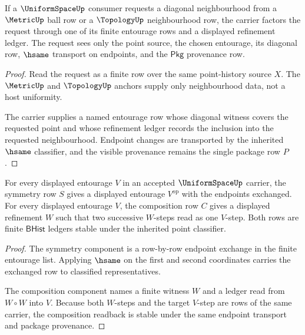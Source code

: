 \begin{theorem}
\label{thm:uniformspace-diagonal-refinement-obligation}
If a $\UniformSpaceUp$ consumer requests a diagonal neighbourhood from a
$\MetricUp$ ball row or a $\TopologyUp$ neighbourhood row, the carrier factors
the request through one of its finite entourage rows and a displayed
refinement ledger. The request sees only the point source, the chosen
entourage, its diagonal row, $\hsame$ transport on endpoints, and the
$\mathsf{Pkg}$ provenance row.
\end{theorem}
\begin{proof}
Read the request as a finite row over the same point-history source $X$. The
$\MetricUp$ and $\TopologyUp$ anchors supply only neighbourhood data, not a
host uniformity.

The carrier supplies a named entourage row whose diagonal witness covers the
requested point and whose refinement ledger records the inclusion into the
requested neighbourhood. Endpoint changes are transported by the inherited
$\hsame$ classifier, and the visible provenance remains the single package
row $P$.
\end{proof}

\begin{theorem}
\label{thm:uniformspace-symmetry-composition-obligation}
For every displayed entourage $V$ in an accepted $\UniformSpaceUp$ carrier,
the symmetry row $S$ gives a displayed entourage $V^{\mathrm{op}}$ with the
endpoints exchanged. For every displayed entourage $V$, the composition row
$C$ gives a displayed refinement $W$ such that two successive $W$-steps read
as one $V$-step. Both rows are finite $\mathsf{BHist}$ ledgers stable under
the inherited point classifier.
\end{theorem}
\begin{proof}
The symmetry component is a row-by-row endpoint exchange in the finite
entourage list. Applying $\hsame$ on the first and second coordinates carries
the exchanged row to classified representatives.

The composition component names a finite witness $W$ and a ledger read from
$W\circ W$ into $V$. Because both $W$-steps and the target $V$-step are rows of
the same carrier, the composition readback is stable under the same endpoint
transport and package provenance.
\end{proof}

